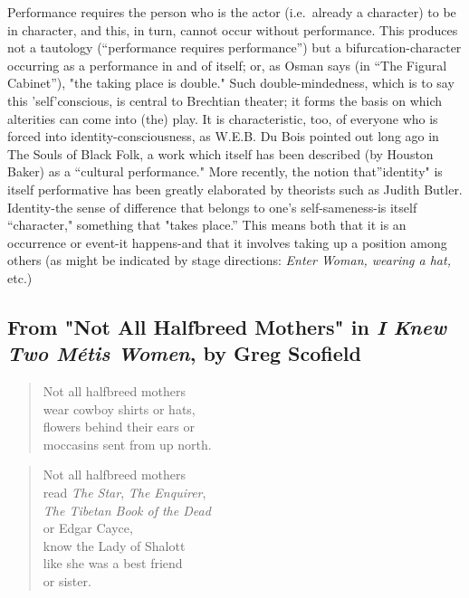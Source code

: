 \documentclass[
]{memoir}
\begin{document}
Performance requires the person who is the actor (i.e.~already a
character) to be in character, and this, in turn, cannot occur without
performance. This produces not a tautology (``performance requires
performance'') but a bifurcation-character occurring as a performance in
and of itself; or, as Osman says (in ``The Figural Cabinet''), "the
taking place is double." Such double-mindedness, which is to say this
'self'conscious, is central to Brechtian theater; it forms the basis on
which alterities can come into (the) play. It is characteristic, too, of
everyone who is forced into identity-consciousness, as W.E.B. Du Bois
pointed out long ago in The Souls of Black Folk, a work which itself has
been described (by Houston Baker) as a ``cultural performance." More
recently, the notion that''identity" is itself performative has been
greatly elaborated by theorists such as Judith Butler. Identity-the
sense of difference that belongs to one's self-sameness-is itself
``character," something that "takes place.'' This means both that it is
an occurrence or event-it happens-and that it involves taking up a
position among others (as might be indicated by stage directions:
\emph{Enter Woman, wearing a hat,} etc.)

\hypertarget{from-not-all-halfbreed-mothers-in-i-knew-two-muxe9tis-women-by-greg-scofield}{%
\subsection*{\texorpdfstring{From "Not All Halfbreed Mothers" in \emph{I
Knew Two Métis Women}, by Greg
Scofield}{From "Not All Halfbreed Mothers" in I Knew Two Métis Women, by Greg Scofield}}\label{from-not-all-halfbreed-mothers-in-i-knew-two-muxe9tis-women-by-greg-scofield}}

\begin{verse}
Not all halfbreed mothers\\
wear cowboy shirts or hats,\\
flowers behind their ears or\\
moccasins sent from up north.\\
\end{verse}

\begin{verse}
Not all halfbreed mothers\\
read \emph{The Star}, \emph{The Enquirer},\\
\emph{The Tibetan Book of the Dead}\\
or Edgar Cayce,\\
know the Lady of Shalott\\
like she was a best friend\\
or sister.\\
\end{verse}
\end{document}
